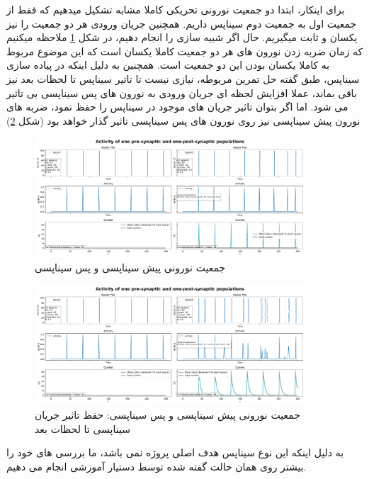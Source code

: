         برای اینکار، ابتدا دو جمعیت نورونی تحریکی کاملا مشابه تشکیل میدهیم که فقط از جمعیت اول به جمعیت دوم سیناپس داریم. همچنین جریان ورودی هر دو جمعیت را نیز یکسان و ثابت میگیریم. حال اگر شبیه سازی را انجام دهیم، در شکل
        \ref{fig:part1-two-ng-with-synapse}
        ملاحظه میکنیم که زمان ضربه زدن نورون های هر دو جمعیت کاملا یکسان است که این موضوع مربوط به کاملا یکسان بودن این دو جمعیت است. همچنین به دلیل اینکه در پیاده سازی سیناپس، طبق گفته حل تمرین مربوطه، نیازی نیست تا تاثیر سیناپس تا لحظات بعد نیز باقی بماند، عملا افزایش لحظه ای جریان ورودی به نورون های پس سیناپسی بی تاثیر می شود. اما اگر بتوان تاثیر جریان های موجود در سیناپس را حفظ نمود، ضربه های نورون پیش سیناپسی نیز روی نورون های پس سیناپسی تاثیر گذار خواهد بود
        (شکل \ref{fig:part1-two-ng-with-synapse-decay})
        \begin{figure}[!ht]
            \centering
            \includegraphics[width=0.9\textwidth]{plots/part1-two-ng-with-synapse.pdf} 
            \caption{جمعیت نورونی پیش سیناپسی و پس سیناپسی}
            \label{fig:part1-two-ng-with-synapse}
        \end{figure}
        \begin{figure}[!ht]
            \centering
            \includegraphics[width=0.9\textwidth]{plots/part1-two-ng-with-synapse-decay.pdf} 
            \caption{جمعیت نورونی پیش سیناپسی و پس سیناپسی: حفظ تاثیر جریان سیناپسی تا لحظات بعد}
            \label{fig:part1-two-ng-with-synapse-decay}
        \end{figure}
        به دلیل اینکه این نوع سیناپس هدف اصلی پروژه نمی باشد، ما بررسی های خود را بیشتر روی همان حالت گفته شده توسط دستیار آموزشی انجام می دهیم.
        

